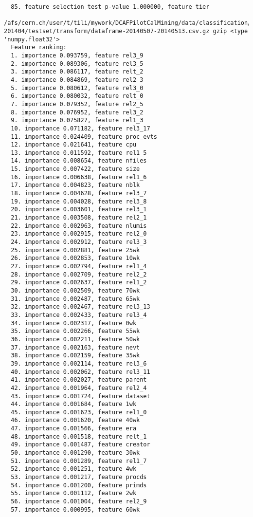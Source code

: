 \begin{verbatim}
  85. feature selection test p-value 1.000000, feature tier
  /afs/cern.ch/user/t/tili/mywork/DCAFPilotCalMining/data/classification/tier2/merge_conf_tier2_201305-201404/testset/transform/dataframe-20140507-20140513.csv.gz gzip <type 'numpy.float32'>
  Feature ranking:
  1. importance 0.093759, feature rel3_9
  2. importance 0.089306, feature rel3_5
  3. importance 0.086117, feature relt_2
  4. importance 0.084869, feature rel2_3
  5. importance 0.080612, feature rel3_0
  6. importance 0.080032, feature relt_0
  7. importance 0.079352, feature rel2_5
  8. importance 0.076952, feature rel3_2
  9. importance 0.075827, feature rel1_3
  10. importance 0.071182, feature rel3_17
  11. importance 0.024409, feature proc_evts
  12. importance 0.021641, feature cpu
  13. importance 0.011592, feature rel1_5
  14. importance 0.008654, feature nfiles
  15. importance 0.007422, feature size
  16. importance 0.006638, feature rel1_6
  17. importance 0.004823, feature nblk
  18. importance 0.004628, feature rel3_7
  19. importance 0.004028, feature rel3_8
  20. importance 0.003601, feature rel3_1
  21. importance 0.003508, feature rel2_1
  22. importance 0.002963, feature nlumis
  23. importance 0.002915, feature rel2_0
  24. importance 0.002912, feature rel3_3
  25. importance 0.002881, feature 25wk
  26. importance 0.002853, feature 10wk
  27. importance 0.002794, feature rel1_4
  28. importance 0.002709, feature rel2_2
  29. importance 0.002637, feature rel1_2
  30. importance 0.002509, feature 70wk
  31. importance 0.002487, feature 65wk
  32. importance 0.002467, feature rel3_13
  33. importance 0.002433, feature rel3_4
  34. importance 0.002317, feature 0wk
  35. importance 0.002266, feature 55wk
  36. importance 0.002211, feature 50wk
  37. importance 0.002163, feature nevt
  38. importance 0.002159, feature 35wk
  39. importance 0.002114, feature rel3_6
  40. importance 0.002062, feature rel3_11
  41. importance 0.002027, feature parent
  42. importance 0.001964, feature rel2_4
  43. importance 0.001724, feature dataset
  44. importance 0.001684, feature 1wk
  45. importance 0.001623, feature rel1_0
  46. importance 0.001620, feature 40wk
  47. importance 0.001566, feature era
  48. importance 0.001518, feature relt_1
  49. importance 0.001487, feature creator
  50. importance 0.001290, feature 30wk
  51. importance 0.001289, feature rel1_7
  52. importance 0.001251, feature 4wk
  53. importance 0.001217, feature procds
  54. importance 0.001200, feature primds
  55. importance 0.001112, feature 2wk
  56. importance 0.001004, feature rel2_9
  57. importance 0.000995, feature 60wk

\end{verbatim}
